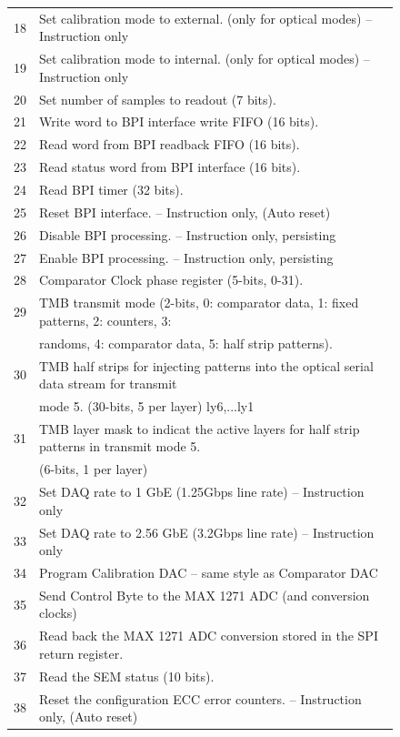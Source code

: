 \documentclass[10pt,a4paper]{article}
\begin{document}
\begin{figure}[H]
{\begin{tabular}{|l|l|}
  18     & Set calibration mode to external. (only for optical modes) -- Instruction only \\
  19     & Set calibration mode to internal. (only for optical modes) -- Instruction only \\
  20     & Set number of samples to readout (7 bits). \\
  21     & Write word to BPI interface write FIFO (16 bits). \\
  22     & Read word from BPI readback FIFO (16 bits). \\
  23     & Read status word from BPI interface (16 bits). \\
  24     & Read BPI timer (32 bits). \\
  25     & Reset BPI interface. -- Instruction only, (Auto reset) \\
  26     & Disable BPI processing. -- Instruction only, persisting \\
  27     & Enable BPI processing. -- Instruction only, persisting \\
  28     & Comparator Clock phase register (5-bits, 0-31). \\
  29     & TMB transmit mode (2-bits, 0: comparator data, 1: fixed patterns, 2: counters, 3: \\
	       & randoms, 4: comparator data, 5: half strip patterns). \\
  30     & TMB half strips for injecting patterns into the optical serial data stream for transmit \\
	       & mode 5. (30-bits, 5 per layer) {ly6,...ly1} \\
  31     & TMB layer mask to indicat the active layers for half strip patterns in transmit mode 5. \\
	       & (6-bits, 1 per layer) \\
  32     & Set DAQ rate to 1 GbE (1.25Gbps line rate) -- Instruction only \\
  33     & Set DAQ rate to 2.56 GbE (3.2Gbps line rate) -- Instruction only \\
  34     & Program Calibration DAC -- same style as Comparator DAC \\
  35     & Send Control Byte to the MAX 1271 ADC (and conversion clocks) \\
  36     & Read back the MAX 1271 ADC conversion stored in the SPI return register. \\
  37     & Read the SEM status (10 bits). \\
  38     & Reset the configuration ECC error counters. -- Instruction only, (Auto reset) \\

\end{tabular}}
\end{figure}
\end{document}
